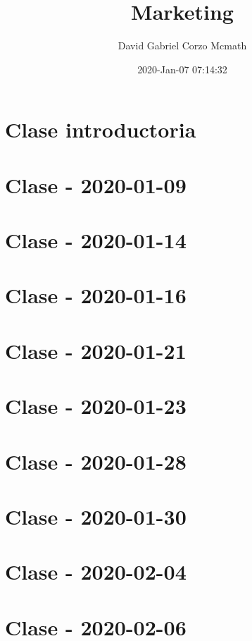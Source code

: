 \documentclass{book}
\title{Marketing}
\author{David Gabriel Corzo Mcmath}
\date{2020-Jan-07 07:14:32}
\begin{document}
\maketitle
\tableofcontents

\chapter{Clase introductoria}


\chapter{Clase - 2020-01-09}


\chapter{Clase - 2020-01-14}


\chapter{Clase - 2020-01-16}


\chapter{Clase - 2020-01-21}


\chapter{Clase - 2020-01-23}


\chapter{Clase - 2020-01-28}


\chapter{Clase - 2020-01-30}


\chapter{Clase - 2020-02-04}


\chapter{Clase - 2020-02-06}

\end{document}
